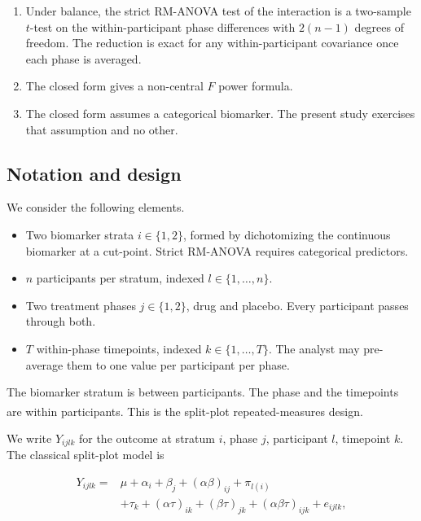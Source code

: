 \documentclass[
  11pt,
]{article}
\providecommand{\tightlist}{%
  \setlength{\itemsep}{0pt}\setlength{\parskip}{0pt}}
\begin{document}
\begin{enumerate}
\def\labelenumi{\arabic{enumi}.}
\tightlist
\item
  Under balance, the strict RM-ANOVA test of the interaction is a
  two-sample \(t\)-test on the within-participant phase differences
  with \(2(n-1)\) degrees of freedom. The reduction is exact for any
  within-participant covariance once each phase is averaged.
\item
  The closed form gives a non-central \(F\) power formula.
\item
  The closed form assumes a categorical biomarker. The present
  study exercises that assumption and no other.
\end{enumerate}

\subsection{Notation and design}\label{notation-and-design}

We consider the following elements.

\begin{itemize}
\tightlist
\item
  Two biomarker strata \(i \in \{1, 2\}\), formed by dichotomizing the
  continuous biomarker at a cut-point. Strict RM-ANOVA requires
  categorical predictors.
\item
  \(n\) participants per stratum, indexed \(l \in \{1, \ldots, n\}\).
\item
  Two treatment phases \(j \in \{1, 2\}\), drug and placebo. Every
  participant passes through both.
\item
  \(T\) within-phase timepoints, indexed \(k \in \{1, \ldots, T\}\). The
  analyst may pre-average them to one value per participant per
  phase.
\end{itemize}

The biomarker stratum is between participants. The phase and the
timepoints are within participants. This is the split-plot
repeated-measures design\textsuperscript{}.

We write \(Y_{ijlk}\) for the outcome at stratum \(i\), phase \(j\),
participant \(l\), timepoint \(k\). The classical split-plot model is

\begin{equation*}
\begin{split}
Y_{ijlk} = {} & \mu + \alpha_i + \beta_j + (\alpha\beta)_{ij}
+ \pi_{l(i)} \\
& + \tau_k + (\alpha\tau)_{ik} + (\beta\tau)_{jk}
+ (\alpha\beta\tau)_{ijk} + e_{ijlk},
\end{split}
\end{equation*}
\end{document}
